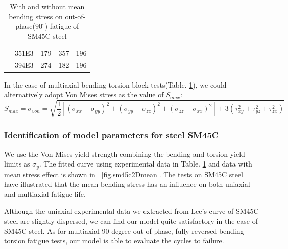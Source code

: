 \documentclass[3p,times,number,review]{elsarticle}
\newcommand{\figref}[1]{\figurename~\ref{#1}}
\begin{document}
\begin{table}[!h]
\begin{tabularx}{\textwidth}{XXXXX}
		& 351E3                                                                                 & 179                                                                                       & 357                                                                                         & 196                                                                                         \\
		& 394E3                                                                                 & 274                                                                                       & 182                                                                                         & 196                                                                                         \\ \hline
	\end{tabularx}
	\caption{With and without mean bending stress on out-of-phase($90^\circ$) fatigue of SM45C steel \cite{lee2013out}}
	\label{meanSM45C}
\end{table}

In the case of multiaxial bending-torsion block tests(Table. \ref{meanSM45C}), we could alternatively adopt Von Mises stress as the value of $S_{max}$:
\begin{equation}
S_{max}=\sigma_{von}=\sqrt{\frac{1}{2}\left[ (\sigma_{xx}-\sigma_{yy})^2+(\sigma_{yy}-\sigma_{zz})^2+(\sigma_{zz}-\sigma_{xx})^2\right]+3(\tau_{xy}^2+\tau_{yz}^2+\tau_{zx}^2) }
\label{von}
\end{equation}

\newpage
\subsubsection{Identification of model parameters for steel SM45C}

We use the Von Mises yield strength combining the bending and torsion yield limits as $\sigma_y$. The fitted curve using experimental data in Table. \ref{meanSM45C} and data with mean stress effect is shown in \figref{fig.sm45c2Dmean}.
The tests on SM45C steel have illustrated that the mean bending stress has an influence on both uniaxial and multiaxial fatigue life. 

Although the uniaxial experimental data we extracted from Lee's curve \cite{lee2013out} of SM45C steel are slightly dispersed, we can find our model quite satisfactory in the case of SM45C steel. As for multiaxial 90 degree out of phase, fully reversed bending-torsion fatigue tests, our model is able to evaluate the cycles to failure.
\end{document}
